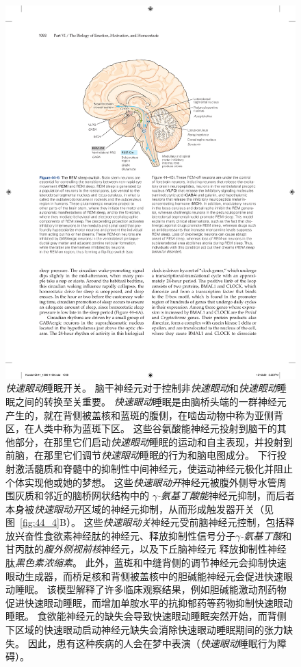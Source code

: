 \begin{figure}[htbp]
	\centering
	\includegraphics[width=0.75\linewidth]{chap44/fig_44_5}
	\caption{\textit{快速眼动}睡眠开关。 脑干神经元对于控制非\textit{快速眼动}和\textit{快速眼动}睡眠之间的转换至关重要。
		\textit{快速眼动}睡眠是由脑桥头端的一群神经元产生的，就在背侧被盖核和蓝斑的腹侧，在啮齿动物中称为亚侧背区，在人类中称为蓝斑下区。
		这些谷氨酸能神经元投射到脑干的其他部分，在那里它们启动\textit{快速眼动}睡眠的运动和自主表现，并投射到前脑，在那里它们调节\textit{快速眼动}睡眠的行为和脑电图成分。
		下行投射激活髓质和脊髓中的抑制性中间神经元，使运动神经元极化并阻止个体实现他或她的梦想。
		这些\textit{快速眼动开}神经元被腹外侧导水管周围灰质和邻近的脑桥网状结构中的 \textit{$\gamma$-氨基丁酸能}神经元抑制，而后者本身被\textit{快速眼动开}区域的神经元抑制，从而形成触发器开关（见图~\ref{fig:44_4}B）。
		这些\textit{快速眼动关}神经元受前脑神经元控制，包括释放兴奋性食欲素神经肽的神经元、释放抑制性信号分子\textit{$\gamma$-氨基丁酸}和甘丙肽的\textit{腹外侧视前核}神经元，以及下丘脑神经元 释放抑制性神经肽\textit{黑色素浓缩素}。
		此外，蓝斑和中缝背侧的调节神经元会抑制快速眼动生成器，而桥足核和背侧被盖核中的胆碱能神经元会促进快速眼动睡眠。
		该模型解释了许多临床观察结果，例如胆碱能激动剂药物促进快速眼动睡眠，而增加单胺水平的抗抑郁药等药物抑制快速眼动睡眠。
		食欲能神经元的缺失会导致快速眼动睡眠突然开始，而背侧下区域的快速眼动启动神经元缺失会消除快速眼动睡眠期间的张力缺失。
		因此，患有这种疾病的人会在梦中表演（\textit{快速眼动}睡眠行为障碍）。}
	\label{fig:44_5}
\end{figure}


